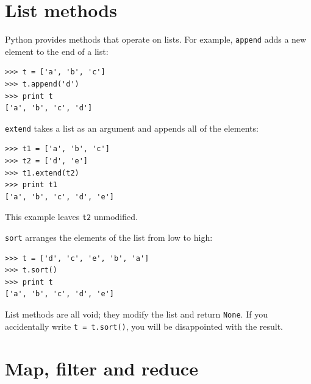 \documentclass[10pt]{book}
\begin{document}

%

%


\section{List methods}

Python provides methods that operate on lists.  For example,
{\tt append} adds a new element to the end of a list:

\begin{verbatim}
>>> t = ['a', 'b', 'c']
>>> t.append('d')
>>> print t
['a', 'b', 'c', 'd']
\end{verbatim}
%
{\tt extend} takes a list as an argument and appends all of
the elements:

\begin{verbatim}
>>> t1 = ['a', 'b', 'c']
>>> t2 = ['d', 'e']
>>> t1.extend(t2)
>>> print t1
['a', 'b', 'c', 'd', 'e']
\end{verbatim}
%
This example leaves {\tt t2} unmodified.

{\tt sort} arranges the elements of the list from low to high:

\begin{verbatim}
>>> t = ['d', 'c', 'e', 'b', 'a']
>>> t.sort()
>>> print t
['a', 'b', 'c', 'd', 'e']
\end{verbatim}
%
List methods are all void; they modify the list and return {\tt None}.
If you accidentally write {\tt t = t.sort()}, you will be disappointed
with the result.


\section{Map, filter and reduce}
\end{document}
